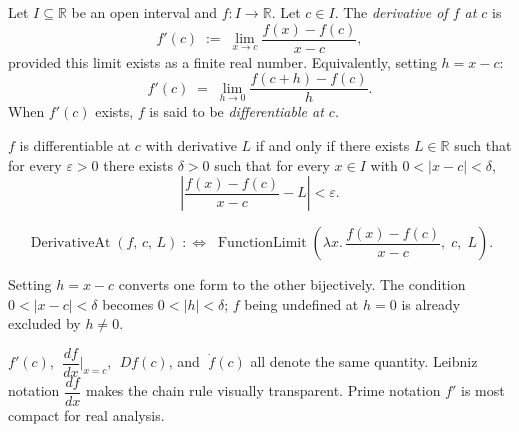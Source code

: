 \begin{tcolorbox}[colback=propbox, colframe=propborder, arc=2pt,
  left=6pt, right=6pt, top=4pt, bottom=4pt,
  title={\small\textbf{Definition (\texorpdfstring{%
    \hyperref[prf:derivative-at-point]{Derivative at a Point}}{Derivative at a Point})}},
  fonttitle=\small\bfseries]
\begin{definition}
\label{def:derivative-at-point}
Let $I \subseteq \mathbb{R}$ be an open interval and $f : I \to \mathbb{R}$.
Let $c \in I$.
The \emph{derivative of $f$ at $c$} is
\[
f'(c) \;:=\; \lim_{x \to c} \frac{f(x) - f(c)}{x - c},
\]
provided this limit exists as a finite real number.
Equivalently, setting $h = x - c$:
\[
f'(c) \;=\; \lim_{h \to 0} \frac{f(c + h) - f(c)}{h}.
\]
When $f'(c)$ exists, $f$ is said to be \emph{differentiable at $c$}.
\end{definition}
\end{tcolorbox}

\begin{remark*}
$f$ is differentiable at $c$ with derivative $L$ if and only if there exists
$L \in \mathbb{R}$ such that for every $\varepsilon > 0$ there exists $\delta > 0$
such that for every $x \in I$ with $0 < |x - c| < \delta$,
\[
\left|\frac{f(x) - f(c)}{x - c} - L\right| < \varepsilon.
\]
\end{remark*}

\begin{remark*}
\[
\operatorname{DerivativeAt}(f,\,c,\,L)
\;:\iff\;
\operatorname{FunctionLimit}\!\left(\lambda x.\,\frac{f(x)-f(c)}{x-c},\;c,\;L\right).
\]
\end{remark*}

\begin{remark}
Setting $h = x - c$ converts one form to the other bijectively.
The condition $0 < |x - c| < \delta$ becomes $0 < |h| < \delta$;
$f$ being undefined at $h = 0$ is already excluded by $h \neq 0$.
\end{remark}

\begin{remark}
$f'(c)$, $\;\dfrac{df}{dx}\big|_{x=c}$, $\;Df(c)$, and $\;\dot{f}(c)$
all denote the same quantity.
Leibniz notation $\dfrac{df}{dx}$ makes the chain rule visually transparent.
Prime notation $f'$ is most compact for real analysis.
\end{remark}

